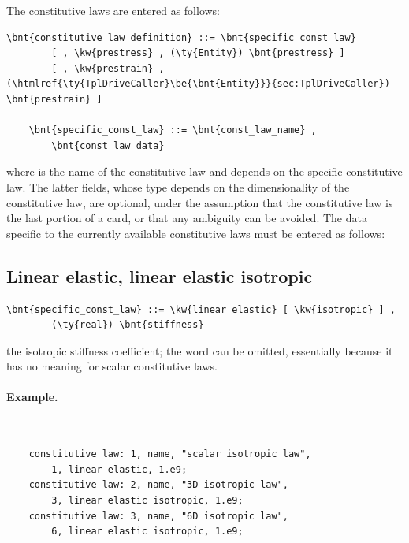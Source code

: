 The constitutive laws are entered as follows:
\begin{Verbatim}[commandchars=\\\{\}]
    \bnt{constitutive_law_definition} ::= \bnt{specific_const_law}
        [ , \kw{prestress} , (\ty{Entity}) \bnt{prestress} ]
        [ , \kw{prestrain} , (\htmlref{\ty{TplDriveCaller}\be{\bnt{Entity}}}{sec:TplDriveCaller}) \bnt{prestrain} ]

    \bnt{specific_const_law} ::= \bnt{const_law_name} ,
        \bnt{const_law_data}
\end{Verbatim}
where  is the name of the constitutive law and
 depends on the specific constitutive law. 
The latter fields, whose type depends on the dimensionality of the
constitutive law, are optional, under the assumption that the
constitutive law is the last portion of a card, or that any ambiguity 
can be avoided.
The data specific to the currently available constitutive laws must be
entered as follows:


\subsection{Linear elastic, linear elastic isotropic}
\begin{Verbatim}[commandchars=\\\{\}]
    \bnt{specific_const_law} ::= \kw{linear elastic} [ \kw{isotropic} ] , 
        (\ty{real}) \bnt{stiffness}
\end{Verbatim}
the isotropic stiffness coefficient; the word 
can be omitted, essentially because it has no meaning
for scalar constitutive laws.

\paragraph{Example.} \
\begin{verbatim}
    constitutive law: 1, name, "scalar isotropic law",
        1, linear elastic, 1.e9;
    constitutive law: 2, name, "3D isotropic law",
        3, linear elastic isotropic, 1.e9;
    constitutive law: 3, name, "6D isotropic law",
        6, linear elastic isotropic, 1.e9;
\end{verbatim}
  
  
